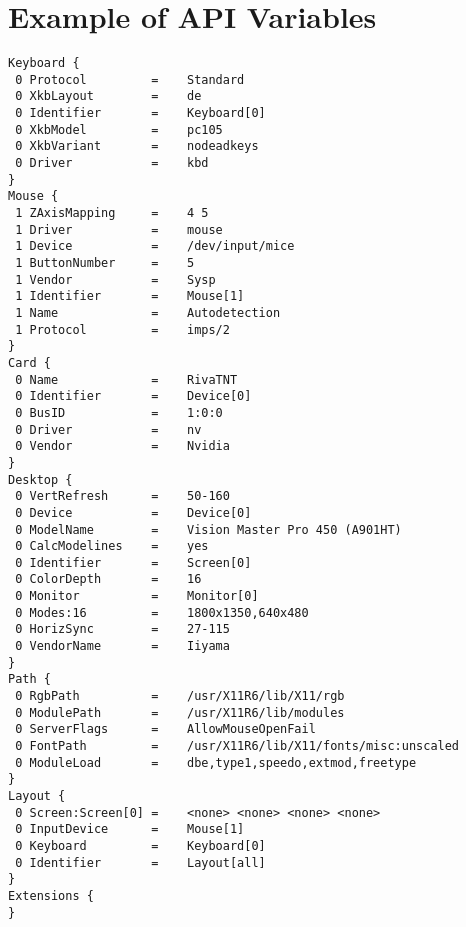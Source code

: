 \section{Example of API Variables}
\begin{small}
\begin{verbatim}
Keyboard {
 0 Protocol         =    Standard
 0 XkbLayout        =    de
 0 Identifier       =    Keyboard[0]
 0 XkbModel         =    pc105
 0 XkbVariant       =    nodeadkeys
 0 Driver           =    kbd
}
Mouse {
 1 ZAxisMapping     =    4 5
 1 Driver           =    mouse
 1 Device           =    /dev/input/mice
 1 ButtonNumber     =    5
 1 Vendor           =    Sysp
 1 Identifier       =    Mouse[1]
 1 Name             =    Autodetection
 1 Protocol         =    imps/2
}
Card {
 0 Name             =    RivaTNT
 0 Identifier       =    Device[0]
 0 BusID            =    1:0:0
 0 Driver           =    nv
 0 Vendor           =    Nvidia
}
Desktop {
 0 VertRefresh      =    50-160
 0 Device           =    Device[0]
 0 ModelName        =    Vision Master Pro 450 (A901HT)
 0 CalcModelines    =    yes
 0 Identifier       =    Screen[0]
 0 ColorDepth       =    16
 0 Monitor          =    Monitor[0]
 0 Modes:16         =    1800x1350,640x480
 0 HorizSync        =    27-115
 0 VendorName       =    Iiyama
}
Path {
 0 RgbPath          =    /usr/X11R6/lib/X11/rgb
 0 ModulePath       =    /usr/X11R6/lib/modules
 0 ServerFlags      =    AllowMouseOpenFail
 0 FontPath         =    /usr/X11R6/lib/X11/fonts/misc:unscaled
 0 ModuleLoad       =    dbe,type1,speedo,extmod,freetype
}
Layout {
 0 Screen:Screen[0] =    <none> <none> <none> <none>
 0 InputDevice      =    Mouse[1]
 0 Keyboard         =    Keyboard[0]
 0 Identifier       =    Layout[all]
}
Extensions {
}
\end{verbatim}
\end{small}
